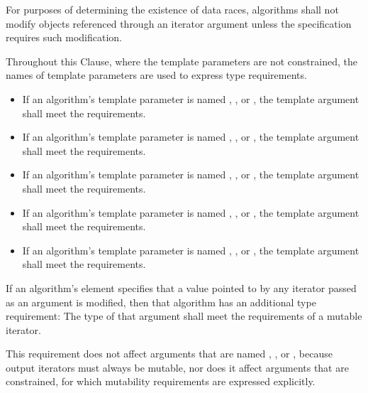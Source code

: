 \pnum
For purposes of determining the existence of data races,
algorithms shall not modify objects referenced through an iterator argument
unless the specification requires such modification.

\pnum
Throughout this Clause, where the template parameters are not constrained,
the names of template parameters are used to express type requirements.
\begin{itemize}
\item
  If an algorithm's template parameter is named
  ,
  , or
  ,
  the template argument shall meet the
   requirements.
\item
  If an algorithm's template parameter is named
  ,
  , or
  ,
  the template argument shall meet the
   requirements.
\item
  If an algorithm's template parameter is named
  ,
  , or
  ,
  the template argument shall meet the
   requirements.
\item
  If an algorithm's template parameter is named
  ,
  , or
  ,
  the template argument shall meet the
   requirements.
\item
  If an algorithm's template parameter is named
  ,
  , or
  ,
  the template argument shall meet the
   requirements.
\end{itemize}

\pnum
If an algorithm's \effects element specifies
that a value pointed to by any iterator passed as an argument is modified,
then that algorithm has an additional type requirement:
The type of that argument shall meet
the requirements of a mutable iterator.
\begin{note}
This requirement does not affect arguments that are named
, , or ,
because output iterators must always be mutable, nor
does it affect arguments that are constrained,
for which mutability requirements are expressed explicitly.
\end{note}

